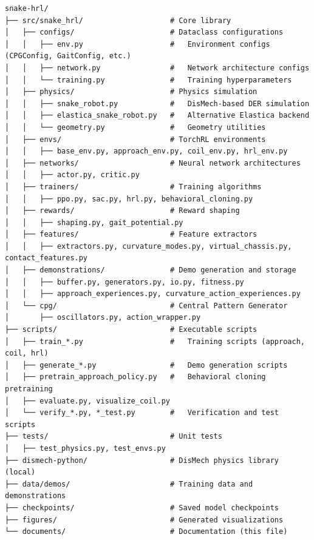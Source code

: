 \documentclass[11pt]{article}
\begin{document}
\begin{listing}[H]
\begin{verbatim}
snake-hrl/
├── src/snake_hrl/                    # Core library
│   ├── configs/                      # Dataclass configurations
│   │   ├── env.py                    #   Environment configs (CPGConfig, GaitConfig, etc.)
│   │   ├── network.py                #   Network architecture configs
│   │   └── training.py               #   Training hyperparameters
│   ├── physics/                      # Physics simulation
│   │   ├── snake_robot.py            #   DisMech-based DER simulation
│   │   ├── elastica_snake_robot.py   #   Alternative Elastica backend
│   │   └── geometry.py               #   Geometry utilities
│   ├── envs/                         # TorchRL environments
│   │   ├── base_env.py, approach_env.py, coil_env.py, hrl_env.py
│   ├── networks/                     # Neural network architectures
│   │   ├── actor.py, critic.py
│   ├── trainers/                     # Training algorithms
│   │   ├── ppo.py, sac.py, hrl.py, behavioral_cloning.py
│   ├── rewards/                      # Reward shaping
│   │   ├── shaping.py, gait_potential.py
│   ├── features/                     # Feature extractors
│   │   ├── extractors.py, curvature_modes.py, virtual_chassis.py, contact_features.py
│   ├── demonstrations/               # Demo generation and storage
│   │   ├── buffer.py, generators.py, io.py, fitness.py
│   │   ├── approach_experiences.py, curvature_action_experiences.py
│   └── cpg/                          # Central Pattern Generator
│       ├── oscillators.py, action_wrapper.py
├── scripts/                          # Executable scripts
│   ├── train_*.py                    #   Training scripts (approach, coil, hrl)
│   ├── generate_*.py                 #   Demo generation scripts
│   ├── pretrain_approach_policy.py   #   Behavioral cloning pretraining
│   ├── evaluate.py, visualize_coil.py
│   └── verify_*.py, *_test.py        #   Verification and test scripts
├── tests/                            # Unit tests
│   ├── test_physics.py, test_envs.py
├── dismech-python/                   # DisMech physics library (local)
├── data/demos/                       # Training data and demonstrations
├── checkpoints/                      # Saved model checkpoints
├── figures/                          # Generated visualizations
└── documents/                        # Documentation (this file)
\end{verbatim}
\caption{Project Directory Structure}
\end{listing}
\end{document}
